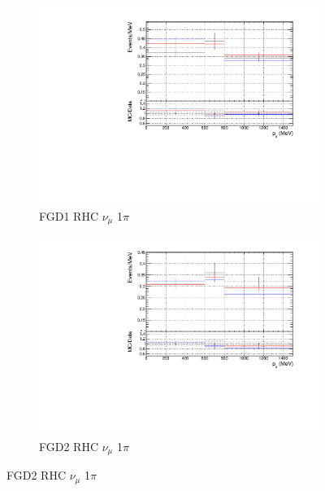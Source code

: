 \begin{figure}[!htbp]
\begin{subfigure}{0.49\textwidth}
  \centering
  \includegraphics[width=\textwidth]{figs/priorpred1D_p_FGD1_NuMuBkg_CC1pi_in_AntiNu_Mode}
  \caption{FGD1 RHC $\nu_{\mu}$ 1$\pi$}
\end{subfigure}
\begin{subfigure}{0.49\textwidth}
  \centering
  \includegraphics[width=\textwidth]{figs/priorpred1D_p_FGD2_NuMuBkg_CC1pi_in_AntiNu_Mode}
  \caption{FGD2 RHC $\nu_{\mu}$ 1$\pi$}
\end{subfigure}


\end{figure}
